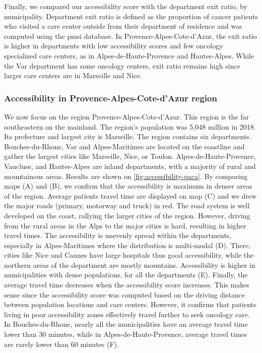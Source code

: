 Finally, we compared our accessibility score with the department exit ratio, by
municipality. Department exit ratio is defined as the proportion of cancer
patients who visited a care center outside from their department of residence
and was computed using the \ac{pmsi} database. In Provence-Alpes-Cote-d'Azur,
the exit ratio is higher in departments with low accessibility scores and few
oncology specialized care centers, as in Alpes-de-Haute-Provence and
Hautes-Alpes. While the Var department has some oncology centers, exit ratio
remains high since larger care centers are in Marseille and Nice.


\subsubsection{Accessibility in Provence-Alpes-Cote-d'Azur region}

We now focus on the region Provence-Alpes-Cote-d'Azur. This region is the far
southeastern on the mainland. The region's population was 5,048 million in 2018.
Its prefecture and largest city is Marseille. The region contains six
departments. Bouches-du-Rhone, Var and Alpes-Maritimes are located on the
coastline and gather the largest cities like Marseille, Nice, or Toulon.
Alpes-de-Haute-Provence, Vaucluse, and Hautes-Alpes are inland departments, with
a majority of rural and mountainous areas. Results are shown on
\cref{fig:accessibility-paca}. By comparing maps (A) and (B), we confirm that
the accessibility is maximum in denser areas of the region. Average patients
travel time are displayed on map (C) and we drew the major roads (primary,
motorway and truck) in red. The road system is well developed on the coast,
rallying the larger cities of the region. However, driving from the rural areas
in the Alps to the major cities is hard, resulting in higher travel times. The
accessibility is unevenly spread within the departments, especially in
Alpes-Maritimes where the distribution is multi-modal (D). There, cities like
Nice and Cannes have large hospitals thus good accessibility, while the northern
areas of the department are mostly mountains. Accessibility is higher in
municipalities with dense populations, for all the departments (E). Finally, the
average travel time decreases when the accessibility score increases. This makes
sense since the accessibility score was computed based on the driving distance
between population locations and care centers. However, it confirms that
patients living in poor accessibility zones effectively travel further to seek
oncology care. In Bouches-du-Rhone, nearly all the municipalities have an
average travel time lower than 30 minutes, while in Alpes-de-Haute-Provence,
average travel times are rarely lower than 60 minutes (F).

